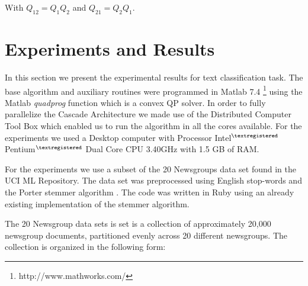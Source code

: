 With $Q_{12}=Q_{1}Q_{2}$ and $Q_{21}=Q_{2}Q_{1}$. 


\section{Experiments and Results}

In this section we present the experimental results for text classification
task. The base algorithm and auxiliary routines were programmed in
Matlab 7.4%
\footnote{http://www.mathworks.com/%
} using the Matlab \emph{quadprog} function which is a convex QP solver.
In order to fully parallelize the Cascade Architecture we made use
of the Distributed Computer Tool Box which enabled us to run the algorithm
in all the cores available. For the experiments we used a Desktop
computer with Processor Intel$^{\textregistered}$ Pentium$^{\textregistered}$
Dual Core CPU 3.40GHz with 1.5 GB of RAM.

For the experiments we use a subset of the 20 Newsgroups \cite{20news}
data set found in the UCI ML Repository\cite{Asuncion+Newman:2007}.
The data set was preprocessed using English stop-words and the Porter
stemmer algorithm \cite{Porter80}. The code was written
in Ruby using an already existing implementation of the stemmer algorithm. 

The 20 Newsgroup data sets is set is a collection of approximately
20,000 newsgroup documents, partitioned evenly across 20 different
newsgroups. The collection is organized in the following form:\\ 

